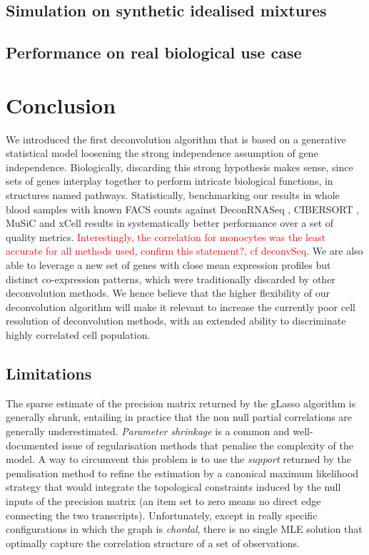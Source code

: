 \documentclass[long, final]{jobim}
\begin{document}
\subsection{Simulation on synthetic idealised mixtures}
\label{subsec:sim-idealised}

\subsection{Performance on real biological use case}
\label{subsec:sim-real}



\section{Conclusion}
\label{sec:conclusion}
We introduced the first deconvolution algorithm that is based on a generative statistical model loosening the strong independence assumption of gene independence. Biologically, discarding this strong hypothesis makes sense, since sets of genes interplay together to perform intricate biological functions, in structures named pathways. 
Statistically, benchmarking our results in whole blood samples with known FACS counts against DeconRNASeq \cite{gong_szustakowski13}, CIBERSORT \cite{newman_etal15}, MuSiC \cite{wang_etal19} and xCell \cite{aran_etal17} results in systematically better performance over a set of quality metrics. \textcolor{red}{Interestingly, the correlation for monocytes was the least accurate for all methods used, confirm this statement?, cf deconvSeq}. We are also able to leverage a new set of genes with close mean expression profiles but distinct co-expression patterns, which were traditionally discarded by other deconvolution methods. We hence believe that the higher flexibility of our deconvolution algorithm will make it relevant to increase the currently poor cell resolution of deconvolution methods, with an extended ability to discriminate highly correlated cell population.  

\subsection{Limitations}
\label{subsec:limitations}

The sparse estimate of the precision matrix returned by the gLasso \cite{mazumder_hastie11} algorithm is generally shrunk, entailing in practice that the non null partial correlations are generally underestimated. \textit{Parameter shrinkage} is a common and well-documented issue of regularisation methods that penalise the complexity of the model. A way to circumvent this problem is to use the \textit{support} returned by the penalisation method to refine the estimation by a canonical maximum likelihood strategy that would integrate the topological constraints induced by the null inputs of the precision matrix (an item set to zero means no direct edge connecting the two transcripts). Unfortunately, except in really specific configurations in which the graph is \textit{chordal}, there is no single MLE solution that optimally capture the correlation structure of a set of observations. 
\end{document}
